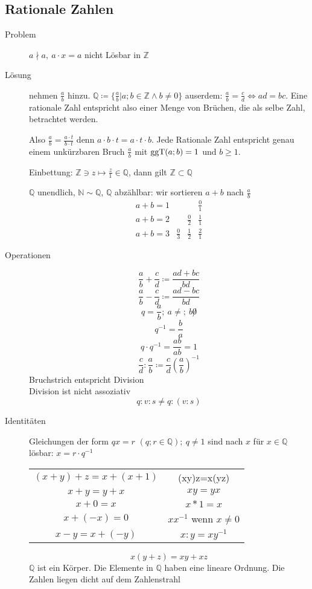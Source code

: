 \subsection{Rationale Zahlen}
\begin{description}
    \item[Problem] $a \nmid a,\ a \cdot x = a$ nicht Lösbar in $\mathbb{Z}$
    \item[Lösung] nehmen $\frac{a}{b}$ hinzu. $\mathbb{Q} \coloneqq \lbrace \frac{a}{b} | a;b \in \mathbb{Z} \wedge b \not = 0 \rbrace$ auserdem: $\frac{a}{b} = \frac{c}{d} \Leftrightarrow ad = bc$. Eine rationale Zahl entspricht also einer Menge von Brüchen, die als selbe Zahl, betrachtet werden.

    Also $\frac{a}{b} = \frac{a \cdot t}{b \cdot t}$ denn $a \cdot b \cdot t = a \cdot t \cdot b$. Jede Rationale Zahl entspricht genau einem unkürzbaren Bruch $\frac{a}{b}$ mit $\operatorname{ggT}(a;b) = 1$ und $b \geq 1$.

    Einbettung: $\mathbb{Z}\ni z \longmapsto \frac{z}{1} \in \mathbb{Q}$, dann gilt $\mathbb{Z} \subset \mathbb{Q}$

    $\mathbb{Q}$ unendlich, $\mathbb{N} \sim \mathbb{Q}$, $\mathbb{Q}$ abzählbar: wir sortieren $a + b$ nach $\frac{a}{b}$
    $$\begin{array}{lccc}
          a + b = 1 &             &             & \frac{0}{1} \\
          a + b = 2 &             & \frac{0}{2} & \frac{1}{1} \\
          a + b = 3 & \frac{0}{3} & \frac{1}{2} & \frac{2}{1}
    \end{array}$$
    \item[Operationen]
    $$\frac{a}{b} + \frac{c}{d} \coloneqq \frac{ad+bc}{bd}$$
    $$\frac{a}{b} - \frac{c}{d} \coloneqq \frac{ad-bc}{bd}$$
    $$q = \frac{a}{b};\ a \not =;\ b \not 0$$
    $$q^{-1} = \frac{b}{a}$$
    $$q \cdot q^{-1} = \frac{ab}{ab} = 1$$
    $$\frac{c}{d}:\frac{a}{b}\coloneqq\frac{c}{d}  \left(\frac{a}{b}\right)^{-1}$$
    Bruchstrich entspricht Division \\
    Division ist nicht assoziativ
    $$q:v:s \not = q:(v:s)$$
    \item[Identitäten] Gleichungen der form $qx=r$ $(q;r \in \mathbb{Q});\ q \not = 1$ sind nach $x$ für $x\in \mathbb{Q}$ lösbar: $x = r \cdot q^{-1}$ \\
    \begin{tabular}[t]{cc}
        $(x+y)+z = x+(x+1)$ & (xy)z=x(yz)                 \\
        $x + y = y + x$     & $xy = yx$                   \\
        $x + 0 = x$         & $x * 1 = x$                 \\
        $x + (-x) = 0$      & $xx^{-1}$ wenn $x \not = 0$ \\
        $x - y = x + (-y)$  & $x:y = xy^{-1}$
    \end{tabular}
    $$x(y+z) = xy + xz$$
    $\mathbb{Q}$ ist ein Körper. Die Elemente in $\mathbb{Q}$ haben eine  lineare Ordnung. Die Zahlen liegen dicht auf dem Zahlenstrahl
\end{description}
